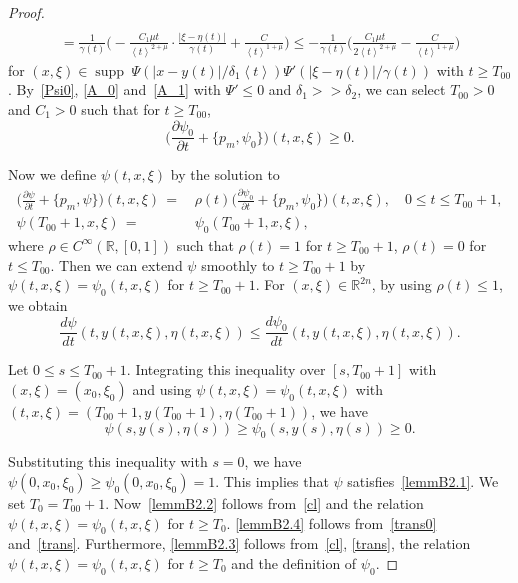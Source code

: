 \documentclass[AHL,Unicode,longabstracts,published]{cedram}
\renewcommand*\c{\gamma}
\renewcommand*\d{\delta}
\newcommand*\g{\psi}
\newcommand*\m{\mu}
\newcommand*\x{\xi}
\newcommand*\y{\eta}
\newcommand{\G}{\Psi}
\newcommand*\re{\mathbb{R}}
\newcommand*\pa{\partial}
\DeclareMathOperator{\supp}{supp\;}
\newcommand{\jap}[1]{\left\langle #1 \right\rangle}
\newcommand{\biggpare}[1]{\biggl(#1\biggr)}
\begin{document}
\begin{proof}
\begin{multline}
\\
 =\frac{1}{\c(t)}\biggpare{-\frac{C_1\m t}{\jap{t}^{2+\m}}\cdot \frac{|\x-\y(t)|}{\c(t)}+\frac{C}{\jap{t}^{1+\m}}}
\leq-\frac{1}{\c(t)}\biggpare{\frac{C_1\m t}{2\jap{t}^{2+\m}}-\frac{C}{\jap{t}^{1+\m}}}
\end{multline}
for $(x,\x)\in \supp \Psi(|x-y(t)|/\d_1\jap{t})\Psi'(|\x-\y(t)|/\c(t))$ with $t\geq T_{00}$. By~\eqref{Psi0}, \eqref{A_0} and~\eqref{A_1} with $\G'\leq 0$ and $\d_1>>\d_2$, we can select $T_{00}>0$ and $C_1>0$ such that for $t\geq T_{00}$,
\begin{equation}\label{trans0}
\biggpare{\frac{\pa \g_0}{\pa t} + \{p_m, \g_0 \}}(t, x,\x)\geq 0.
\end{equation}

Now we define $\g(t,x,\x)$ by the solution to
\begin{equation}\label{trans}
\begin{aligned}
\biggpare{\frac{\pa \g}{\pa t} + \{p_m, \g \}}(t, x,\x)\,=\,& \rho(t)\biggpare{\frac{\pa \g_0}{\pa t} + \{p_m, \g_0 \}}(t, x,\x), \quad 0\leq t\leq T_{00}+1,
\\
\g(T_{00}+1,x,\x)\,=\,& \g_0(T_{00}+1, x, \x),
\end{aligned}
\end{equation}
where $\rho \in C^{\infty}(\re, [0,1])$ such that $\rho(t)=1$ for $t\geq T_{00}+1$, $\rho(t) = 0$ for $t\leq T_{00}$. Then we can extend $\g$ smoothly to $t\geq T_{00} + 1$ by $ \g(t,x,\x) = \g_0(t, x, \x)$ for $t \geq T_{00}+1$. For $(x,\x)\in \re^{2n}$, by using $\rho(t)\leq 1$, we obtain
\[
\frac{d\g}{dt}(t,y(t,x,\x),\y(t,x,\x))\leq \frac{d\g_0}{dt}(t,y(t,x,\x),\y(t,x,\x)).
\]


Let $0\leq s\leq T_{00}+1$. Integrating this inequality over $[s,T_{00}+1]$ with $(x,\x)=(x_0,\x_0)$ and using $ \g(t,x,\x) = \g_0(t, x, \x)$ with $(t, x,\x)=(T_{00}+1, y(T_{00}+1), \y(T_{00}+1))$, we have
\[
\g(s,y(s),\y(s)) \geq \g_0(s,y(s),\y(s))\geq 0.
\]


Substituting this inequality with $s=0$, we have $\g(0,x_0,\x_0)\geq \g_0(0,x_0,\x_0)=1$. This implies that $\g$ satisfies~\eqref{lemmB2.1}. We set $T_0=T_{00}+1$. Now~\eqref{lemmB2.2} follows from~\eqref{cl} and the relation $\g(t,x,\x)=\g_0(t,x,\x)$ for $t\geq T_0$. \eqref{lemmB2.4} follows from~\eqref{trans0} and~\eqref{trans}. Furthermore, \eqref{lemmB2.3} follows from~\eqref{cl}, \eqref{trans}, the relation $\g(t,x,\x)=\g_0(t,x,\x)$ for $t\geq T_0$ and the definition of $\g_0$.
\end{proof}
\end{document}
